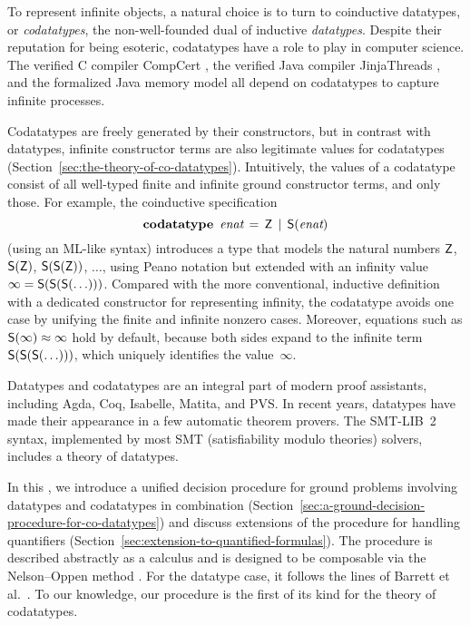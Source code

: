 To represent infinite objects, %
a natural choice is to turn to coinductive datatypes, or \emph{codatatypes},
the non-well-founded dual of inductive \emph{datatypes}.
%
Despite their reputation for being esoteric, codatatypes have a
role to play in computer science. The verified C compiler CompCert
\cite{leroy-2009}, the verified Java compiler Jinja\-Threads
\cite{lochbihler-2010-jinja}, and the formalized Java memory model
\cite{lochbihler-2014-jmm} all depend on codatatypes to capture infinite
processes.

Codatatypes are freely generated by their constructors, but in contrast with datatypes,
infinit\-e constructor terms are also legitimate values for codatatypes
(Section~\ref{sec:the-theory-of-co-datatypes}). Intuitively, the
values of a codatatype consist of all well-typed finite and infinite ground
constructor
terms, and only those. For example, the coinductive specification
%
\[\textbf{codatatype}~\,\textit{enat} \,=\, \textsf{Z} \,\mid\, \textsf{S}(\textit{enat})\]
%
(using an ML-like syntax) introduces a type that
models the natural numbers $\textsf{Z}$, $\textsf{S}(\textsf{Z})$, $\textsf{S}(\textsf{S}(\textsf{Z}))$, $\ldots$\afterLdots{},
using Peano notation but extended with an
infinity value $\infty = \textsf{S}(\textsf{S}(\textsf{S}(\ldots)))$. Compared
with the more conventional, inductive definition with a dedicated constructor
for representing infinity,
%
the codatatype avoids one case by unifying the finite and infinite nonzero cases.
Moreover, equations such as $\textsf{S}(\infty) \approx \infty$ hold by default,
because both sides expand to the infinite term
$\textsf{S}(\textsf{S}(\textsf{S}(\ldots)))$, which uniquely identifies the
value~$\infty$.

\nopagebreak

Datatypes and codatatypes are an integral part of modern proof assistants,
including Agda, Coq, Isabelle, Matita, and PVS. In recent years, datatypes
have made their appearance in a few automatic theorem provers. The SMT-LIB~2
\cite{barrett-et-al-2010} syntax, implemented by most SMT (satisfiability
modulo theories) solvers, includes a theory of datatypes.

\pagebreak

In this \thewordpaper, we introduce a unified decision procedure for ground
problems involving datatypes and codatatypes in combination
(Section~\ref{sec:a-ground-decision-procedure-for-co-datatypes})
and discuss extensions  of the procedure for handling quantifiers
(Section~\ref{sec:extension-to-quantified-formulas}).
The procedure is described abstractly as a calculus and is
designed to be composable via the Nelson--Oppen method \cite{nelson-oppen-1979}.
For the datatype case, it follows the lines of Barrett et al.\ \cite{barrett-et-al-2007}.
To our knowledge, our procedure is the first of its kind for the theory of
codatatypes. 

